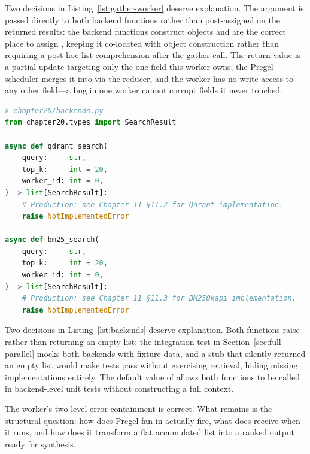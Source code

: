 Two decisions in Listing~\ref{lst:gather-worker} deserve explanation.
The  argument is passed directly to both backend
functions rather than post-assigned on the returned results: the backend
functions construct  objects and are the correct place
to assign , keeping it co-located with object construction
rather than requiring a post-hoc list comprehension after the gather call.
The return value  is a partial update
targeting only the one field this worker owns; the Pregel scheduler merges
it into  via the  reducer, and the
worker has no write access to any other  field---a bug
in one worker cannot corrupt fields it never touched.

\begin{lstlisting}[language=Python,
  caption={Backend stubs: typed signatures with \texttt{worker\_id} propagation},
  label={lst:backends}]
# chapter20/backends.py
from chapter20.types import SearchResult

async def qdrant_search(
    query:     str,
    top_k:     int = 20,
    worker_id: int = 0,
) -> list[SearchResult]:
    # Production: see Chapter 11 §11.2 for Qdrant implementation.
    raise NotImplementedError

async def bm25_search(
    query:     str,
    top_k:     int = 20,
    worker_id: int = 0,
) -> list[SearchResult]:
    # Production: see Chapter 11 §11.3 for BM25Okapi implementation.
    raise NotImplementedError
\end{lstlisting}

Two decisions in Listing~\ref{lst:backends} deserve explanation.
Both functions raise  rather than returning an
empty list: the integration test in Section~\ref{sec:full-parallel} mocks
both backends with fixture data, and a stub that silently returned an
empty list would make tests pass without exercising retrieval, hiding
missing implementations entirely. The  default value of
 allows both functions to be called in backend-level unit tests
without constructing a full  context.

The worker's two-level error containment is correct. What remains is the
structural question: how does Pregel fan-in actually fire, what does
 receive when it runs, and how does it transform a
flat accumulated list into a ranked output ready for synthesis.



